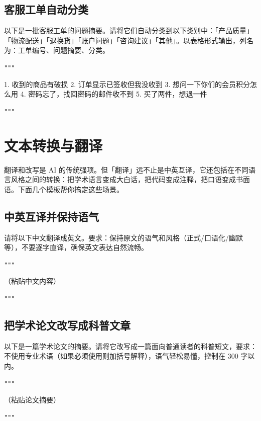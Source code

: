 \subsection*{客服工单自动分类}

\begin{promptbox}
以下是一批客服工单的问题摘要。请将它们自动分类到以下类别中：「产品质量」「物流配送」「退换货」「账户问题」「咨询建议」「其他」。以表格形式输出，列名为：工单编号、问题摘要、分类。

\verb|"""|

1. 收到的商品有破损
2. 订单显示已签收但我没收到
3. 想问一下你们的会员积分怎么用
4. 密码忘了，找回密码的邮件收不到
5. 买了两件，想退一件

\verb|"""|
\end{promptbox}

\section{文本转换与翻译}

翻译和改写是 AI 的传统强项。但「翻译」远不止是中英互译，它还包括在不同语言风格之间的转换：把学术语言变成大白话，把代码变成注释，把口语变成书面语。下面几个模板帮你搞定这些场景。

\subsection*{中英互译并保持语气}

\begin{promptbox}
请将以下中文翻译成英文。要求：保持原文的语气和风格（正式/口语化/幽默等），不要逐字直译，确保英文表达自然流畅。

\verb|"""|

（粘贴中文内容）

\verb|"""|
\end{promptbox}

\subsection*{把学术论文改写成科普文章}

\begin{promptbox}
以下是一篇学术论文的摘要。请将它改写成一篇面向普通读者的科普短文，要求：不使用专业术语（如果必须使用则加括号解释），语气轻松易懂，控制在 300 字以内。

\verb|"""|

（粘贴论文摘要）

\verb|"""|
\end{promptbox}

